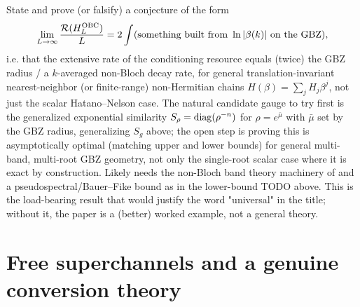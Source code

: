 \begin{todo}
State and prove (or falsify) a conjecture of the form
\begin{equation}
\lim_{L\to\infty}\frac{\mathcal R(H_L^{\rm OBC})}{L}
=2\int (\text{something built from }\ln|\beta(k)|\text{ on the GBZ}),
\end{equation}
i.e. that the extensive rate of the conditioning resource equals
(twice) the GBZ radius / a $k$-averaged non-Bloch decay rate, for
general translation-invariant nearest-neighbor (or finite-range)
non-Hermitian chains $H(\beta)=\sum_j H_j\beta^j$, not just the
scalar Hatano--Nelson case. The natural candidate gauge to try first
is the generalized exponential similarity
$S_\rho=\operatorname{diag}(\rho^{-n})$ for $\rho=e^{\bar\mu}$ with $\bar\mu$ set
by the GBZ radius, generalizing $S_g$ above; the open step is
proving this is asymptotically optimal (matching upper and lower
bounds) for general multi-band, multi-root GBZ geometry, not only
the single-root scalar case where it is exact by construction.
Likely needs the non-Bloch band theory machinery of
\cite{OkumaEtAl2020,YaoWang} and a pseudospectral/Bauer--Fike bound
as in the lower-bound TODO above. This is the load-bearing result
that would justify the word "universal" in the title; without it,
the paper is a (better) worked example, not a general theory.
\end{todo}

\section{Free superchannels and a genuine conversion theory}
\label{sec:free-ops}

